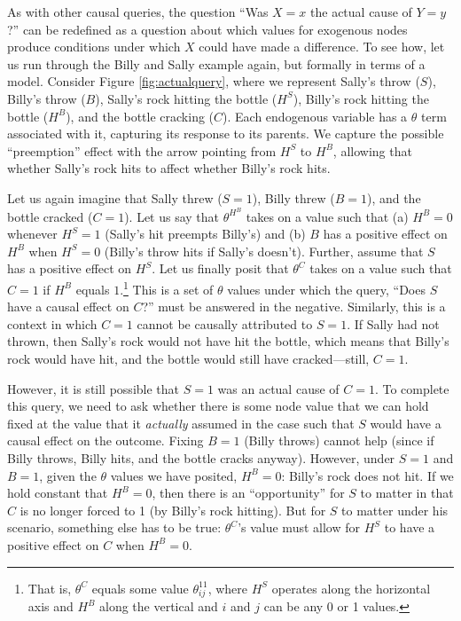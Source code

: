 \documentclass[
  12pt,
]{book}
\begin{document}
As with other causal queries, the question ``Was \(X=x\) the actual cause of \(Y=y\)?'' can be redefined as a question about which values for exogenous nodes produce conditions under which \(X\) could have made a difference. To see how, let us run through the Billy and Sally example again, but formally in terms of a model. Consider Figure \ref{fig:actualquery}, where we represent Sally's throw (\(S\)), Billy's throw (\(B\)), Sally's rock hitting the bottle (\(H^S\)), Billy's rock hitting the bottle (\(H^B\)), and the bottle cracking (\(C\)). Each endogenous variable has a \(\theta\) term associated with it, capturing its response to its parents. We capture the possible ``preemption'' effect with the arrow pointing from \(H^S\) to \(H^B\), allowing that whether Sally's rock hits to affect whether Billy's rock hits.

Let us again imagine that Sally threw (\(S=1\)), Billy threw (\(B=1\)), and the bottle cracked (\(C=1\)). Let us say that \(\theta^{H^B}\) takes on a value such that (a) \(H^B=0\) whenever \(H^S=1\) (Sally's hit preempts Billy's) and (b) \(B\) has a positive effect on \(H^B\) when \(H^S=0\) (Billy's throw hits if Sally's doesn't). Further, assume that \(S\) has a positive effect on \(H^S\). Let us finally posit that \(\theta^C\) takes on a value such that \(C=1\) if \(H^B\) equals \(1\).\footnote{That is, \(\theta^C\) equals some value \(\theta_{ij}^{11}\), where \(H^S\) operates along the horizontal axis and \(H^B\) along the vertical and \(i\) and \(j\) can be any 0 or 1 values.} This is a set of \(\theta\) values under which the query, ``Does \(S\) have a causal effect on \(C\)?'' must be answered in the negative. Similarly, this is a context in which \(C=1\) cannot be causally attributed to \(S=1\). If Sally had not thrown, then Sally's rock would not have hit the bottle, which means that Billy's rock would have hit, and the bottle would still have cracked---still, \(C=1\).

However, it is still possible that \(S=1\) was an actual cause of \(C=1\). To complete this query, we need to ask whether there is some node value that we can hold fixed at the value that it \emph{actually} assumed in the case such that \(S\) would have a causal effect on the outcome. Fixing \(B=1\) (Billy throws) cannot help (since if Billy throws, Billy hits, and the bottle cracks anyway). However, under \(S=1\) and \(B=1\), given the \(\theta\) values we have posited, \(H^B=0\): Billy's rock does not hit. If we hold constant that \(H^B=0\), then there is an ``opportunity'' for \(S\) to matter in that \(C\) is no longer forced to 1 (by Billy's rock hitting). But for \(S\) to matter under his scenario, something else has to be true: \(\theta^C\)'s value must allow for \(H^S\) to have a positive effect on \(C\) when \(H^B=0\).
\end{document}
